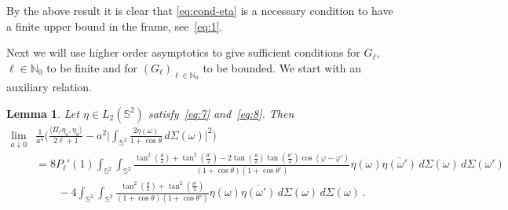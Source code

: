 \documentclass[a4paper,11pt,DIV=11,%
abstract=on%
]{scrartcl}
\newtheorem{lemma}[thm]{Lemma}
\newcommand{\red}[1]{#1}
\begin{document}
\red{By the above result it is clear that \eqref{eq:cond-eta} is a
  necessary condition to have a finite upper bound in the frame,
  see~\eqref{eq:1}.}

Next we will use higher order asymptotics to give sufficient conditions for  $G_\ell$, $\ell \in \mathbb N_0$ to be finite and for 
$(G_\ell)_{\ell \in \mathbb N_0}$ to be bounded. We start with an auxiliary relation.

\begin{lemma}\label{prop-second-order-asymp}
  Let $\eta\in L_2(\mathbb S^2)$ \red{satisfy~\eqref{eq:7}
  and~\eqref{eq:8}. Then}
	\begin{align*}
		\lim_{a\downarrow 0}
		&\frac{1}{a^4}\Biggl(\frac{\langle\Pi_\ell\eta_a,\eta_a\rangle}{2\ell+1}
		-a^2\biggl|\int_{\mathbb S^2}\frac{2\eta(\omega)}{1+\cos\theta}\,d\Sigma(\omega)\biggr|^2\Biggr)\\
		&=
		8P_\ell'(1)\int_{\mathbb S^2}\int_{\mathbb S^2}
		\frac{\tan^2(\tfrac{\theta}{2})+\tan^2(\tfrac{\theta'}{2})
			-2\tan(\tfrac{\theta}{2})\tan(\tfrac{\theta'}{2})\cos(\varphi-\varphi')}
		{(1+\cos\theta)(1+\cos\theta')}\eta(\omega)\overline{\eta(\omega')}\,d\Sigma(\omega) \,d\Sigma(\omega')\\
		&\qquad -4\int_{\mathbb S^2}\int_{\mathbb S^2}
		\frac{\tan^2(\tfrac{\theta}{2})+\tan^2(\tfrac{\theta'}{2})}{(1+\cos\theta)(1+\cos\theta')}
		\eta(\omega)\overline{\eta(\omega')}\,d\Sigma(\omega)\,d\Sigma(\omega)\,.
	\end{align*}
\end{lemma}
\end{document}
